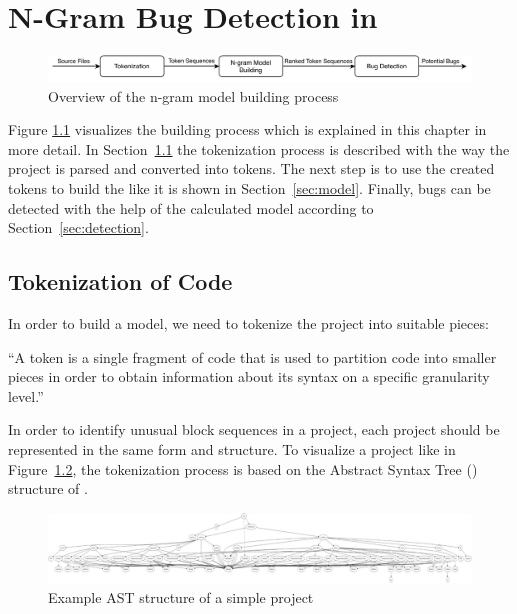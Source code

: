 \chapter{N-Gram Bug Detection in \scratch{}}\label{chap:methods}

\begin{figure}[hbtp]
\centering
\includegraphics[scale=0.75]{images/Overview.pdf}
\caption{Overview of the n-gram model building process}
\label{fig:overview}
\end{figure}

Figure \ref{fig:overview} visualizes the \ngram{} building process which is explained in this chapter in more detail. In Section~\ref{sec:tokenization} the tokenization process is described with the way the \scratch{} project is parsed and converted into tokens. The next step is to use the created tokens to build the \ngram{} like it is shown in Section~\ref{sec:model}. Finally, bugs can be detected with the help of the calculated model according to Section~\ref{sec:detection}.

\section{Tokenization of \scratch{} Code}\label{sec:tokenization}
In order to build a model, we need to tokenize the \scratch{} project into suitable pieces:

\begin{definition}[Token]\label{def:token}
    ``A token is a single fragment of \scratch{} code that is used to partition code into smaller pieces in order to obtain information about its syntax on a specific granularity level.''
\end{definition}

In order to identify unusual block sequences in a \scratch{} project, each project should be represented in the same form and structure. To visualize a \scratch{} project like in Figure~\ref{fig:ast}, the tokenization process is based on the Abstract Syntax Tree (\AST{}) structure of \litterbox{}. 

\begin{figure}[hbtp]
\centering
\includegraphics[scale=0.20]{images/AST_example(3).png}
\caption{Example AST structure of a simple \scratch{} project}
\label{fig:ast}
\end{figure}

